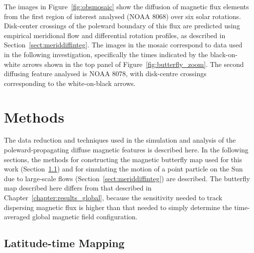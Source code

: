 The images in Figure~\ref{fig:obsmosaic} show the diffusion of magnetic flux elements from the first region of interest analysed (NOAA 8068) over six solar rotations. Disk-center crossings of the poleward boundary of this flux are predicted using empirical meridional flow and differential rotation profiles, as described in Section~\ref{sect:meriddiffinteg}. 
The images in the mosaic correspond to data used in the following investigation, specifically the times indicated by the black-on-white arrows shown in the top panel of Figure~\ref{fig:butterfly_zoom}. The second diffusing feature analysed is NOAA 8078, with disk-centre crossings corresponding to the white-on-black arrows. %


\section{Methods}\label{sect:diffmeth}

The data reduction and techniques used in the simulation and analysis of the poleward-propagating diffuse magnetic features is described here. In the following sections, the methods for constructing the magnetic butterfly map used for this work (Section~\ref{sect:lattimemeth}) and for simulating the motion of a point particle on the Sun due to large-scale flows (Section~\ref{sect:meriddiffinteg}) are described. The butterfly map described here differs from that described in Chapter~\ref{chapter:results_global}, because the sensitivity needed to track dispersing magnetic flux is higher than that needed to simply determine the time-averaged global magnetic field configuration.

\subsection{Latitude-time Mapping}\label{sect:lattimemeth}

